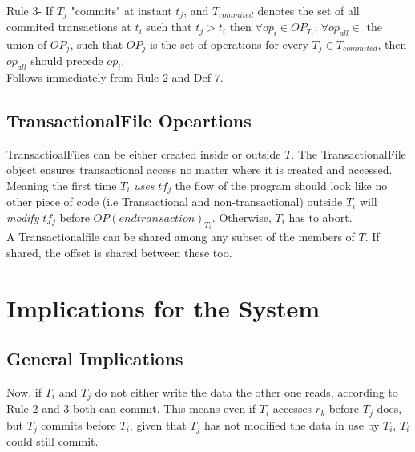 \documentclass[a4paper, 11pt]{article}
\begin{document}




Rule 3- If $T_j$ "commits" at instant $t_j$, and $T_{commited}$ denotes the set of all commited transactions at $t_i$ such that $t_j > t_i$ then $\forall op_i \in OP_{T_i}$, $\forall op_{all} \in$ the union of $OP_j$, such that $OP_j$ is the set of operations  for every $T_j \in T_{commited}$, then $op_{all}$  should precede $op_{i}$.\\

Follows immediately from Rule 2 and Def 7. 

\subsection{TransactionalFile Opeartions}
TransactioalFiles can be either created inside or outside $T$. The TransactionalFile object ensures transactional access no matter where it is created and accessed. Meaning the first time $T_i$ \emph {uses} $tf_j$ the flow of the program should look like no other piece of code (i.e Transactional and non-transactional) outside $T_i$ will \emph {modify} $tf_j$ before $OP(endtransaction)_{T_i}$. Otherwise, $T_i$ has to abort. \\


A Transactionalfile can be shared among any subset of the members of $T$. If shared, the offset is shared between these too. 

\section{Implications for the System}

\subsection{General Implications}
Now, if $T_i$ and $T_j$ do not either write the data the other one reads, according to Rule 2 and 3 both can commit. This means even if $T_i$ accesses $r_k$ before $T_j$ does, but $T_j$ commits before $T_i$, given that $T_j$ has not modified the data in use by $T_i$, $T_i$ could still commit. \\
\end{document}
